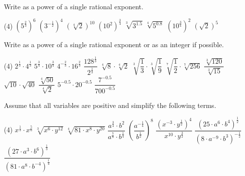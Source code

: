 \begin{exercise}
	Write as a power of a single rational exponent.
	\begin{tasks}(4)
		\task $\left(5^{\frac{2}{3}}\right)^6$
		\task $\left(3^{-\frac{1}{2}}\right)^4$
		\task $\left(\sqrt[4]{2}\right)^{10}$
		\task $\left(10^2\right)^\frac{3}{4}$
		\task $\sqrt[3]{3^{1.5}}$
		\task $\sqrt[4]{5^{0.8}}$
		\task $\left(10^{\frac{3}{4}}\right)^2$
		\task $\left(\sqrt{2}\right)^5$
	\end{tasks}
\end{exercise}
\pagebreak[4]
\begin{exercise}
	Write as a power of a single rational exponent or as an integer if possible.
	\begin{tasks}(4)
		\task $2^\frac{1}{3}\cdot 4^\frac{1}{3}$
		\task $5^{\frac{3}{4}}\cdot 10^\frac{3}{4}$
		\task $4^{-\frac{2}{3}}\cdot 16^\frac{2}{3}$
		\task $\dfrac{128^\frac{1}{3}}{2^\frac{1}{3}}$
		\task $\sqrt[4]{8}\cdot\sqrt[4]{2}$
		\task $\sqrt[3]{\dfrac{1}{3}}\cdot\sqrt[3]{\dfrac{1}{9}}$
		\task $\sqrt[7]{\dfrac{1}{2}}\cdot\sqrt[7]{256}$
		\task $\dfrac{\sqrt[3]{120}}{\sqrt[3]{15}}$
		\task $\sqrt{10}\cdot\sqrt{40}$
		\task $\dfrac{\sqrt[4]{50}}{\sqrt[4]{2}}$
		\task $5^{-0.5}\cdot 20^{-0.5}$
		\task $\dfrac{7^{-0.5}}{700^{-0.5}}$
	\end{tasks}
\end{exercise}
\begin{exercise}
	Assume that all variables are positive and simplify the following terms.
	\begin{tasks}(4)
		\task $x^{\frac{1}{3}}\cdot x^{\frac{5}{6}}$
		\task $\sqrt[3]{x^6\cdot y^{12}}$
		\task $\sqrt[4]{81\cdot x^8\cdot y^{20}}$
		\task $\dfrac{a^{\frac{3}{4}}\cdot b^2}{a^\frac{7}{8}\cdot b^\frac{1}{4}}$
		\task $\left(\dfrac{a^{-\frac{1}{4}}}{b^\frac{1}{2}}\right)^8$
		\task $\dfrac{\left(x^{-3}\cdot y^{\frac{1}{2}}\right)^4}{x^{10}\cdot y^{\frac{3}{2}}}$
		\task $\dfrac{\left(25\cdot a^6\cdot b^4\right)^\frac{1}{2}}{\left(8\cdot a^{-9}\cdot b^3\right)^{-\frac{1}{2}}}$
		\task $\dfrac{\left(27\cdot a^3\cdot b^6\right)^\frac{1}{3}}{\left(81\cdot a^8\cdot b^{-4}\right)^\frac{1}{4}}$
	\end{tasks}
\end{exercise}